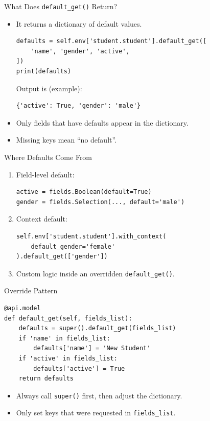 \begin{frame}[fragile]{What Does \texttt{default\_get()} Return?}
	\begin{block}{}
		\begin{itemize}
			\item It returns a dictionary of default values.
\begin{lstlisting}
defaults = self.env['student.student'].default_get([
	'name', 'gender', 'active',
])
print(defaults)
\end{lstlisting}
			Output is (example):
\begin{lstlisting}
{'active': True, 'gender': 'male'}
\end{lstlisting}
			\item Only fields that have defaults appear in the dictionary.
			\item Missing keys mean ``no default''.
		\end{itemize}
	\end{block}
\end{frame}

\begin{frame}[fragile]{Where Defaults Come From}
	\begin{enumerate}
		\item Field-level default:
\begin{lstlisting}
active = fields.Boolean(default=True)
gender = fields.Selection(..., default='male')
\end{lstlisting}
		\item Context default:
\begin{lstlisting}
self.env['student.student'].with_context(
	default_gender='female'
).default_get(['gender'])
\end{lstlisting}
		\item Custom logic inside an overridden \texttt{default\_get()}.
	\end{enumerate}
\end{frame}

\begin{frame}[fragile]{Override Pattern}
\begin{lstlisting}
@api.model
def default_get(self, fields_list):
	defaults = super().default_get(fields_list)
	if 'name' in fields_list:
		defaults['name'] = 'New Student'
	if 'active' in fields_list:
		defaults['active'] = True
	return defaults
\end{lstlisting}
	\begin{itemize}
		\item Always call \texttt{super()} first, then adjust the dictionary.
		\item Only set keys that were requested in \texttt{fields\_list}.
	\end{itemize}
\end{frame}


